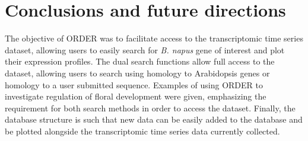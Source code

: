 \documentclass[12pt,]{book}
\begin{document}
\section{Conclusions and future
directions}\label{conclusions-and-future-directions}

The objective of ORDER was to facilitate access to the transcriptomic
time series dataset, allowing users to easily search for \emph{B. napus}
gene of interest and plot their expression profiles. The dual search
functions allow full access to the dataset, allowing users to search
using homology to Arabidopsis genes or homology to a user submitted
sequence. Examples of using ORDER to investigate regulation of floral
development were given, emphasizing the requirement for both search
methods in order to access the dataset. Finally, the database structure
is such that new data can be easily added to the database and be plotted
alongside the transcriptomic time series data currently collected.
\end{document}
